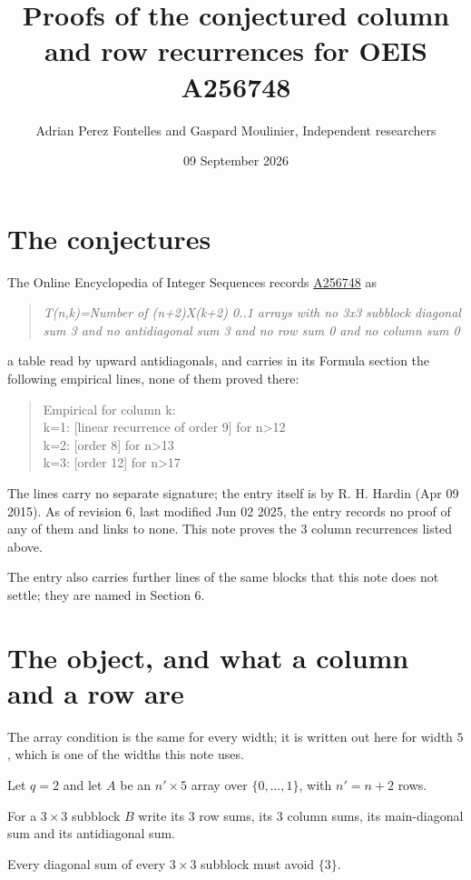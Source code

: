 \documentclass[11pt]{article}
\title{Proofs of the conjectured column and row recurrences for OEIS A256748}
\author{Adrian Perez Fontelles and Gaspard Moulinier, Independent researchers}
\date{09 September 2026}
\theoremstyle{definition}
\begin{document}
\maketitle
\section{The conjectures}

The Online Encyclopedia of Integer Sequences records \href{https://oeis.org/A256748}{A256748} as

\begin{quote}\itshape T(n,k)=Number of (n+2)X(k+2) 0..1 arrays with no 3x3 subblock diagonal sum 3 and no antidiagonal sum 3 and no row sum 0 and no column sum 0\end{quote}

a table read by upward antidiagonals, and carries in its Formula section the following empirical lines, none of them proved there:

\begin{quote}\ttfamily Empirical for column k:\\
k=1: [linear recurrence of order 9] for n>12\\k=2: [order 8] for n>13\\k=3: [order 12] for n>17\end{quote}

The lines carry no separate signature; the entry itself is by R. H. Hardin (Apr 09 2015). As of revision 6, last modified Jun 02 2025, the entry records no proof of any of them and links to none. This note proves the 3 column recurrences listed above.

The entry also carries further lines of the same blocks that this note does not settle; they are named in Section 6.

\section{The object, and what a column and a row are}

The array condition is the same for every width; it is written out here for width $5$, which is one of the widths this note uses.

Let $q = 2$ and let $A$ be an $n' \times 5$ array over $\{0,\dots,1\}$, with $n' = n + 2$ rows.

For a $3\times3$ subblock $B$ write its 3 row sums, its 3 column sums, its main-diagonal sum and its antidiagonal sum.

Every diagonal sum of every $3\times3$ subblock must avoid $\{3\}$.
\end{document}
